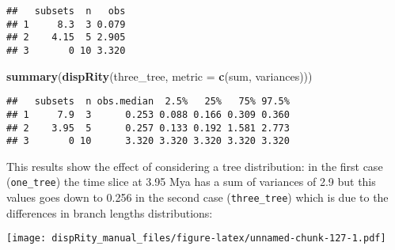 \documentclass[
]{book}
\newenvironment{Shaded}{\begin{snugshade}}{\end{snugshade}}
\newcommand{\ControlFlowTok}[1]{\textcolor[rgb]{0.13,0.29,0.53}{\textbf{#1}}}
\newcommand{\DataTypeTok}[1]{\textcolor[rgb]{0.13,0.29,0.53}{#1}}
\newcommand{\DecValTok}[1]{\textcolor[rgb]{0.00,0.00,0.81}{#1}}
\newcommand{\FloatTok}[1]{\textcolor[rgb]{0.00,0.00,0.81}{#1}}
\newcommand{\KeywordTok}[1]{\textcolor[rgb]{0.13,0.29,0.53}{\textbf{#1}}}
\newcommand{\NormalTok}[1]{#1}
\newcommand{\OperatorTok}[1]{\textcolor[rgb]{0.81,0.36,0.00}{\textbf{#1}}}
\newcommand{\StringTok}[1]{\textcolor[rgb]{0.31,0.60,0.02}{#1}}
\begin{document}
\begin{verbatim}
##   subsets  n   obs
## 1     8.3  3 0.079
## 2    4.15  5 2.905
## 3       0 10 3.320
\end{verbatim}

\begin{Shaded}
\begin{Highlighting}[]
\KeywordTok{summary}\NormalTok{(}\KeywordTok{dispRity}\NormalTok{(three\_tree, }\DataTypeTok{metric =} \KeywordTok{c}\NormalTok{(sum, variances)))}
\end{Highlighting}
\end{Shaded}

\begin{verbatim}
##   subsets  n obs.median  2.5%   25%   75% 97.5%
## 1     7.9  3      0.253 0.088 0.166 0.309 0.360
## 2    3.95  5      0.257 0.133 0.192 1.581 2.773
## 3       0 10      3.320 3.320 3.320 3.320 3.320
\end{verbatim}

This results show the effect of considering a tree distribution: in the first case (\texttt{one\_tree}) the time slice at 3.95 Mya has a sum of variances of 2.9 but this values goes down to 0.256 in the second case (\texttt{three\_tree}) which is due to the differences in branch lengths distributions:

\begin{Shaded}
\end{Shaded}

\texttt{[image: dispRity\_manual\_files/figure-latex/unnamed-chunk-127-1.pdf]}
\end{document}
